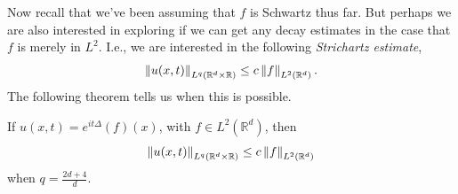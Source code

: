 \documentclass{article}
\begin{document}
Now recall that we've been assuming that $f$ is Schwartz thus far. But perhaps we are also interested in exploring if we can get any decay estimates in the case that $f$ is merely in $L^{2}$. I.e., we are interested in the following \textit{Strichartz estimate}, 
\begin{equation*}
	\left\Vert u(x,t) \right\Vert_{L^{q}(\mathbb{R}^{d} \times \mathbb{R})} \leq c\left\Vert f \right\Vert_{L^{2}(\mathbb{R}^{d})}. 
\end{equation*}
The following theorem tells us when this is possible. 
\begin{theorem}
	If $u(x, t) = e^{it\Delta}(f)(x)$, with $f \in L^{2}(\mathbb{R}^{d})$, then 
	\begin{equation*}
		\left\Vert u(x,t) \right\Vert_{L^{q}(\mathbb{R}^{d} \times \mathbb{R})} \leq c\left\Vert f \right\Vert_{L^{2}(\mathbb{R}^{d})}
	\end{equation*}
	when $q = \frac{2d + 4}{d}$. 
\end{theorem} 
\end{document}
